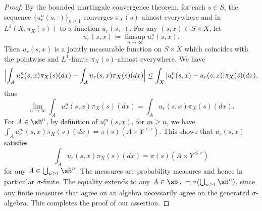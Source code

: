 \documentclass[12pt,reqno]{amsart}%
\theoremstyle{plain}
\theoremstyle{definition}
\def\abs#1{|#1|}
\begin{document}
\begin{proof}
	By the bounded martingale convergence theorem,
	for each $s\in S$, the sequence
	$\{u^n_r(s,\cdot)\}_{n\geq1}$ converges $\pi_X(s)$-almost everywhere
	and in $L^1(X,\pi_X(s))$ to a function $u_r(s,\cdot)$.  For any $(s,x)\in S\times X$, let
	\[
		u_r(s,x)\coloneqq\limsup_{n\rightarrow\infty}u_r^n(s,x).
	\]
	Then $u_r(s,x)$ is a jointly measurable function on $S\times X$
	which coincides with the pointwise and $L^1$-limits $\pi_X(s)$-almost everywhere.
	We have
	\[
		\Bigl|\int_A u^n_r(s,x)\pi_X(s)(dx)-\int_A u_r(s,x)\pi_X(s)(dx)\Bigr|
		\leq\int_X\abs{u^n_r(s,x)- u_r(s,x)}\pi_X(s)(dx),
	\]
	thus
	\[
		\lim_{n\rightarrow\infty}\int_A u^n_r(s,x)\pi_X(s)(dx)=\int_A u_r(s,x)\pi_X(s)(dx).
	\]
	For $A\in\sB^n$,
	by definition of $u^m_r(s,x)$, for $m\geq n$, we have
	$
		\int_{A} u^{m}_r(s,x)\pi_X(s)(dx)=\pi(s)(A\times Y^{\leq r}).
	$
	This shows that $u_r(s,x)$ satisfies
	\[
		\int_A u_r(s,x)\pi_X(s)(dx)=\pi(s)(A\times Y^{\leq r})
	\]
	for any $A\in\bigcup_{n\geq 1}\sB^n$.
	The measures are probability measures and hence in particular $\sigma$-finite.
	The equality extends to any $A\in\sB_X=\sigma(\bigcup_{n\geq 1}\sB^n)$,
	since  any finite measures that agree on an algebra necessarily agree on the generated
	$\sigma$-algebra.
	This completes the proof of our assertion.
\end{proof}
\end{document}
